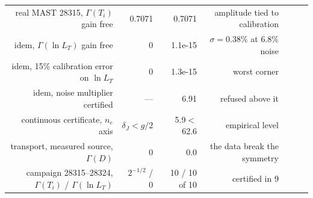 \begin{table}[htbp]
\begin{tabular}{@{}rrrrrrl@{}}
real MAST 28315, $\Gamma(T_i)$ gain free & 0.7071 & 0.7071 & amplitude tied to calibration \\
idem, $\Gamma(\ln L_T)$ gain free & 0 & 1.1e-15 & $\sigma=0.38$\% at 6.8\% noise \\
idem, 15\% calibration error on $\ln L_T$ & 0 & 1.3e-15 & worst corner \\
idem, noise multiplier certified & --- & 6.91 & refused above it \\
continuous certificate, $n_e$ axis & $\delta_J<g/2$ & 5.9$<$62.6 & empirical level \\
transport, measured source, $\Gamma(D)$ & 0 & 0.0 & the data break the symmetry \\
campaign 28315--28324, $\Gamma(T_i)$ / $\Gamma(\ln L_T)$ & $2^{-1/2}$ / 0 & 10 / 10 of 10 & certified in 9 \\
\bottomrule
\end{tabular}
\end{table}
